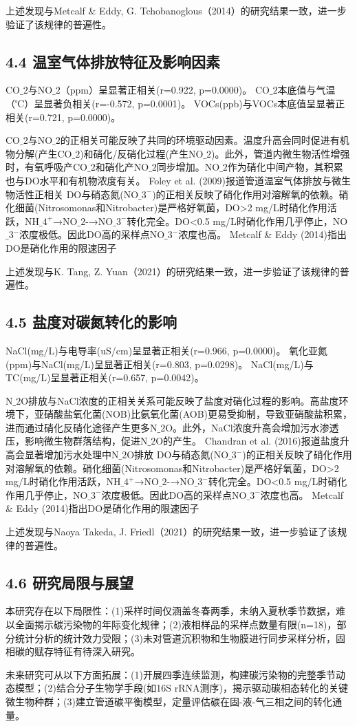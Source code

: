 上述发现与Metcalf \& Eddy, G. Tchobanoglous（2014）的研究结果一致，进一步验证了该规律的普遍性。

\subsection{4.4 温室气体排放特征及影响因素}

CO$\_2$与NO$\_2$（ppm）呈显著正相关(r=0.922, p=0.0000)。
CO$\_2$本底值与气温（℃）呈显著负相关(r=-0.572, p=0.0001)。
VOCs(ppb)与VOCs本底值呈显著正相关(r=0.721, p=0.0000)。

CO$\_2$与NO$\_2$的正相关可能反映了共同的环境驱动因素。温度升高会同时促进有机物分解(产生CO$\_2$)和硝化/反硝化过程(产生NO$\_2$)。此外，管道内微生物活性增强时，有氧呼吸产CO$\_2$和硝化产NO$\_2$同步增加。NO$\_2$作为硝化中间产物，其积累也与DO水平和有机物浓度有关。
Foley et al. (2009)报道管道温室气体排放与微生物活性正相关
DO与硝态氮(NO$\_3^-$)的正相关反映了硝化作用对溶解氧的依赖。硝化细菌(Nitrosomonas和Nitrobacter)是严格好氧菌，DO>2 mg/L时硝化作用活跃，NH$\_4^+$→NO$\_2$-→NO$\_3^-$转化完全。DO<0.5 mg/L时硝化作用几乎停止，NO$\_3^-$浓度极低。因此DO高的采样点NO$\_3^-$浓度也高。
Metcalf \& Eddy (2014)指出DO是硝化作用的限速因子

上述发现与K. Tang, Z. Yuan（2021）的研究结果一致，进一步验证了该规律的普遍性。

\subsection{4.5 盐度对碳氮转化的影响}

NaCl(mg/L)与电导率(uS/cm)呈显著正相关(r=0.966, p=0.0000)。
氧化亚氮(ppm)与NaCl(mg/L)呈显著正相关(r=0.803, p=0.0298)。
NaCl(mg/L)与TC(mg/L)呈显著正相关(r=0.657, p=0.0042)。

N$\_2$O排放与NaCl浓度的正相关关系可能反映了盐度对硝化过程的影响。高盐度环境下，亚硝酸盐氧化菌(NOB)比氨氧化菌(AOB)更易受抑制，导致亚硝酸盐积累，进而通过硝化反硝化途径产生更多N$\_2$O。此外，NaCl浓度升高会增加污水渗透压，影响微生物群落结构，促进N$\_2$O的产生。
Chandran et al. (2016)报道盐度升高会显著增加污水处理中N$\_2$O排放
DO与硝态氮(NO$\_3^-$)的正相关反映了硝化作用对溶解氧的依赖。硝化细菌(Nitrosomonas和Nitrobacter)是严格好氧菌，DO>2 mg/L时硝化作用活跃，NH$\_4^+$→NO$\_2$-→NO$\_3^-$转化完全。DO<0.5 mg/L时硝化作用几乎停止，NO$\_3^-$浓度极低。因此DO高的采样点NO$\_3^-$浓度也高。
Metcalf \& Eddy (2014)指出DO是硝化作用的限速因子

上述发现与Naoya Takeda, J. Friedl（2021）的研究结果一致，进一步验证了该规律的普遍性。

\subsection{4.6 研究局限与展望}

本研究存在以下局限性：(1)采样时间仅涵盖冬春两季，未纳入夏秋季节数据，难以全面揭示碳污染物的年际变化规律；(2)液相样品的采样点数量有限(n=18)，部分统计分析的统计效力受限；(3)未对管道沉积物和生物膜进行同步采样分析，固相碳的赋存特征有待深入研究。

未来研究可从以下方面拓展：(1)开展四季连续监测，构建碳污染物的完整季节动态模型；(2)结合分子生物学手段(如16S rRNA测序)，揭示驱动碳相态转化的关键微生物种群；(3)建立管道碳平衡模型，定量评估碳在固-液-气三相之间的转化通量。
